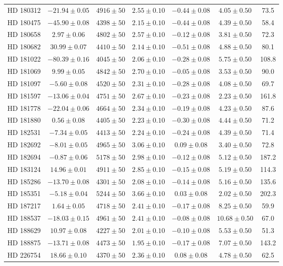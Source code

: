 \begin{table*}
\begin{tabular}{ccccccc}
HD 180312 & $-21.94 \pm 0.05$ & $4916 \pm 50$ & $2.55 \pm 0.10$ & $-0.44 \pm 0.08$ & $4.05 \pm 0.50$ & 73.5 \\
HD 180475 & $-45.90 \pm 0.08$ & $4398 \pm 50$ & $2.15 \pm 0.10$ & $-0.44 \pm 0.08$ & $4.39 \pm 0.50$ & 58.4 \\
HD 180658 & $2.97 \pm 0.06$ & $4802 \pm 50$ & $2.57 \pm 0.10$ & $-0.12 \pm 0.08$ & $3.81 \pm 0.50$ & 72.3 \\
HD 180682 & $30.99 \pm 0.07$ & $4410 \pm 50$ & $2.14 \pm 0.10$ & $-0.51 \pm 0.08$ & $4.88 \pm 0.50$ & 80.1 \\
HD 181022 & $-80.39 \pm 0.16$ & $4045 \pm 50$ & $2.06 \pm 0.10$ & $-0.28 \pm 0.08$ & $5.75 \pm 0.50$ & 108.8 \\
HD 181069 & $9.99 \pm 0.05$ & $4842 \pm 50$ & $2.70 \pm 0.10$ & $-0.05 \pm 0.08$ & $3.53 \pm 0.50$ & 90.0 \\
HD 181097 & $-5.60 \pm 0.08$ & $4520 \pm 50$ & $2.31 \pm 0.10$ & $-0.28 \pm 0.08$ & $4.08 \pm 0.50$ & 69.7 \\
HD 181597 & $-13.06 \pm 0.04$ & $4751 \pm 50$ & $2.67 \pm 0.10$ & $-0.23 \pm 0.08$ & $2.23 \pm 0.50$ & 161.8 \\
HD 181778 & $-22.04 \pm 0.06$ & $4664 \pm 50$ & $2.34 \pm 0.10$ & $-0.19 \pm 0.08$ & $4.23 \pm 0.50$ & 87.6 \\
HD 181880 & $0.56 \pm 0.08$ & $4405 \pm 50$ & $2.23 \pm 0.10$ & $-0.30 \pm 0.08$ & $4.44 \pm 0.50$ & 71.2 \\
HD 182531 & $-7.34 \pm 0.05$ & $4413 \pm 50$ & $2.24 \pm 0.10$ & $-0.24 \pm 0.08$ & $4.39 \pm 0.50$ & 71.4 \\
HD 182692 & $-8.01 \pm 0.05$ & $4965 \pm 50$ & $3.06 \pm 0.10$ & $0.09 \pm 0.08$ & $3.40 \pm 0.50$ & 72.8 \\
HD 182694 & $-0.87 \pm 0.06$ & $5178 \pm 50$ & $2.98 \pm 0.10$ & $-0.12 \pm 0.08$ & $5.12 \pm 0.50$ & 187.2 \\
HD 183124 & $14.96 \pm 0.01$ & $4911 \pm 50$ & $2.85 \pm 0.10$ & $-0.15 \pm 0.08$ & $5.19 \pm 0.50$ & 114.3 \\
HD 185286 & $-13.70 \pm 0.08$ & $4301 \pm 50$ & $2.08 \pm 0.10$ & $-0.14 \pm 0.08$ & $5.16 \pm 0.50$ & 135.6 \\
HD 185351 & $-5.18 \pm 0.04$ & $5244 \pm 50$ & $3.66 \pm 0.10$ & $0.03 \pm 0.08$ & $2.02 \pm 0.50$ & 202.3 \\
HD 187217 & $1.64 \pm 0.05$ & $4718 \pm 50$ & $2.41 \pm 0.10$ & $-0.17 \pm 0.08$ & $8.25 \pm 0.50$ & 59.9 \\
HD 188537 & $-18.03 \pm 0.15$ & $4961 \pm 50$ & $2.41 \pm 0.10$ & $-0.08 \pm 0.08$ & $10.68 \pm 0.50$ & 67.0 \\
HD 188629 & $10.97 \pm 0.08$ & $4227 \pm 50$ & $2.01 \pm 0.10$ & $-0.10 \pm 0.08$ & $5.53 \pm 0.50$ & 51.3 \\
HD 188875 & $-13.71 \pm 0.08$ & $4473 \pm 50$ & $1.95 \pm 0.10$ & $-0.17 \pm 0.08$ & $7.07 \pm 0.50$ & 143.2 \\
HD 226754 & $18.66 \pm 0.10$ & $4370 \pm 50$ & $2.36 \pm 0.10$ & $0.08 \pm 0.08$ & $4.78 \pm 0.50$ & 62.5 \\
\hline
\end{tabular}
\end{table*}
